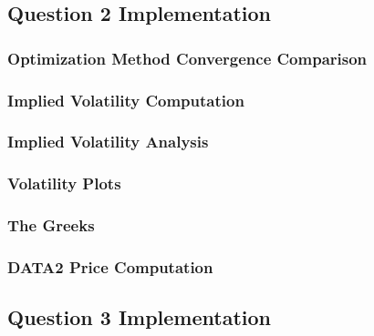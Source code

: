 \documentclass[10pt]{article}
\begin{document}
    \newpage
    \subsection{Question 2 Implementation}
        
        \subsubsection{Optimization Method Convergence Comparison} \label{appendix:source:q2:convergence}
            

        \subsubsection{Implied Volatility Computation} \label{appendix:source:q2:imp_vol}
            
        
        \subsubsection{Implied Volatility Analysis} \label{appendix:source:q2:vol_analysis}
            
        
        \subsubsection{Volatility Plots} \label{appendix:source:q2:vol_plots}
            

        \subsubsection{The Greeks} \label{appendix:source:q2:greeks}
            
        
        \subsubsection{DATA2 Price Computation} \label{appendix:source:q2:data2}
            

    \newpage
    \subsection{Question 3 Implementation} \label{appendix:q3}
        
\end{document}
